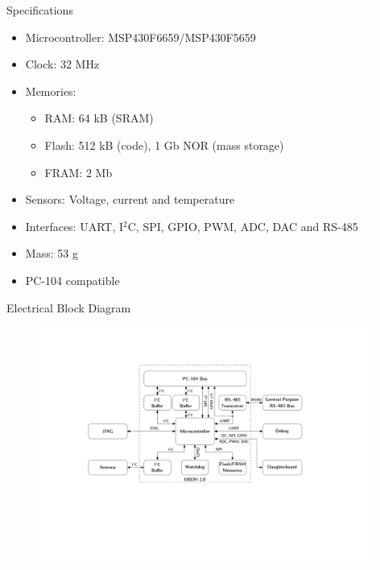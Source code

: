 %
%
%
%
%

%
%
%
%
%


\begin{frame}{Specifications}

    \begin{itemize}
        \item Microcontroller: MSP430F6659/MSP430F5659
        \item Clock: 32 MHz
        \item Memories:
        \begin{itemize}
            \item RAM: 64 kB (SRAM)
            \item Flash: 512 kB (code), 1 Gb NOR (mass storage)
            \item FRAM: 2 Mb
        \end{itemize}
        \item Sensors: Voltage, current and temperature
        \item Interfaces: UART, I$^{2}$C, SPI, GPIO, PWM, ADC, DAC and RS-485
        \item Mass: 53 g
        \item PC-104 compatible
    \end{itemize}

\end{frame}


\begin{frame}{Electrical Block Diagram}

    \begin{figure}[!ht]
        \begin{center}
            \includegraphics[width=11cm]{figures/block-diagram}
        \end{center}
    \end{figure}

\end{frame}

